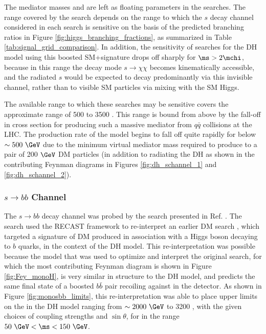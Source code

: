 The mediator masses \ms and \mZp are left as floating parameters in the searches. The \ms range covered by the search depends on the range to which the \(s\) decay channel considered in each search is sensitive on the basis of the predicted branching ratios in Figure \ref{fig:higgs_branching_fractions}, as summarized in Table \ref{tab:signal_grid_comparison}. In addition, the sensitivity of searches for the DH model using this boosted SM+\met signature drops off sharply for \(\ms > 2\mchi\), because in this \ms range the decay mode \(s\rightarrow\chi\chi\) becomes kinematically accessible, and the radiated \(s\) would be expected to decay predominantly via this invisible channel, rather than to visible SM particles via mixing with the SM Higgs. 

The available \mZp range to which these searches may be sensitive covers the approximate range of 500 to 3500 \GeV. This range is bound from above by the fall-off in cross section for producing such a massive \Zprime mediator from \(q\bar{q}\) collisions at the LHC. The production rate of the model begins to fall off quite rapidly for \mZp below \(\sim500~\GeV\) due to the minimum virtual mediator mass required to produce to a pair of 200\(~\GeV\) DM particles (in addition to radiating the DH as shown in the contributing Feynman diagrams in Figures \ref{fig:dh_schannel_1} and \ref{fig:dh_schannel_2}).


\subsubsection{\(s\rightarrow bb\) Channel}
The \(s\rightarrow bb\) decay channel was probed by the search presented in Ref. \cite{ATL-PHYS-PUB-2019-032}. The search used the RECAST framework \cite{Cranmer2011} to re-interpret an earlier DM search \cite{ATLAS-CONF-2018-039}, which targeted a signature of DM produced in association with a Higgs boson decaying to \(b\) quarks, in the context of the DH model. This re-interpretation was possible because the model that was used to optimize and interpret the original search, for which the most contributing Feynman diagram is shown in Figure \ref{fig:Fey_monoH}, is very similar in structure to the DH model, and predicts the same final state of a boosted \(b\bar{b}\) pair recoiling against \met in the detector. As shown in Figure \ref{fig:monosbb_limits}, this re-interpretation was able to place upper limits on the \mZp in the DH model ranging from \(\sim2000~\GeV\) to 3200 \GeV, with the given choices of coupling strengths and \(\sin\theta\), for \ms in the range \(50~\GeV<\ms<150~\GeV\). 

